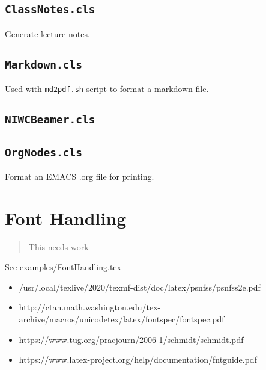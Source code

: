 \documentclass[
]{md2pdf}
\begin{document}
\hypertarget{classnotes.cls}{%
\subsection{\texorpdfstring{\texttt{ClassNotes.cls}}{ClassNotes.cls}}\label{classnotes.cls}}

Generate lecture notes.

\hypertarget{markdown.cls}{%
\subsection{\texorpdfstring{\texttt{Markdown.cls}}{Markdown.cls}}\label{markdown.cls}}

Used with \texttt{md2pdf.sh} script to format a markdown file.

\hypertarget{niwcbeamer.cls}{%
\subsection{\texorpdfstring{\texttt{NIWCBeamer.cls}}{NIWCBeamer.cls}}\label{niwcbeamer.cls}}

\hypertarget{orgnodes.cls}{%
\subsection{\texorpdfstring{\texttt{OrgNodes.cls}}{OrgNodes.cls}}\label{orgnodes.cls}}

Format an EMACS .org file for printing.

\hypertarget{font-handling}{%
\section{Font Handling}\label{font-handling}}

\begin{quote}
This needs work
\end{quote}

See examples/FontHandling.tex

\begin{itemize}
\item
  /usr/local/texlive/2020/texmf-dist/doc/latex/psnfss/psnfss2e.pdf
\item
  http://ctan.math.washington.edu/tex-archive/macros/unicodetex/latex/fontspec/fontspec.pdf
\item
  https://www.tug.org/pracjourn/2006-1/schmidt/schmidt.pdf
\item
  https://www.latex-project.org/help/documentation/fntguide.pdf
\end{itemize}
\end{document}

